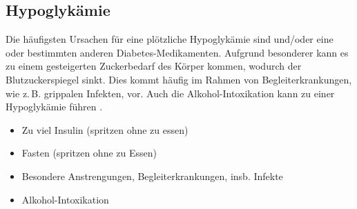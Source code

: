 



\subsection{Hypoglykämie}
\label{topic:hypoglykaemie}



{%
Die häufigsten Ursachen für eine plötzliche Hypoglykämie
sind  und/oder eine 
oder bestimmten anderen Diabetes-Medikamenten. 
Aufgrund
besonderer  kann es zu einem gesteigerten
Zuckerbedarf des Körper kommen, wodurch der
Blutzuckerspiegel sinkt. Dies kommt häufig im Rahmen von
Begleiterkrankungen, wie z.\,B. grippalen Infekten, vor.
Auch die Alkohol-Intoxikation kann zu einer Hypoglykämie
führen \citep{LoefflerBiochemie7}. 
\bigskip
}{%
\begin{itemize}
  \item Zu viel Insulin (spritzen ohne zu essen)
  \item Fasten (spritzen ohne zu Essen)
  \item Besondere Anstrengungen, Begleiterkrankungen,
  insb. Infekte
  \item Alkohol-Intoxikation
\end{itemize}
}{}{}{}






